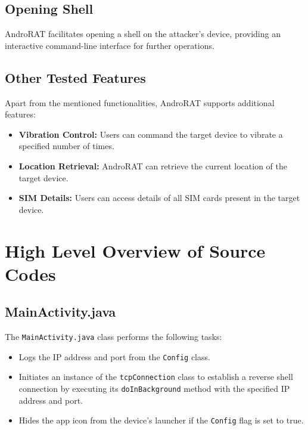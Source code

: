 \documentclass[12pt]{article}
\begin{document}
\subsection{Opening Shell}
AndroRAT facilitates opening a shell on the attacker's device, providing an interactive command-line interface for further operations.

\subsection{Other Tested Features}
Apart from the mentioned functionalities, AndroRAT supports additional features:
\begin{itemize}
    \item \textbf{Vibration Control:} Users can command the target device to vibrate a specified number of times.
    \item \textbf{Location Retrieval:} AndroRAT can retrieve the current location of the target device.
    \item \textbf{SIM Details:} Users can access details of all SIM cards present in the target device.
\end{itemize}

\section{High Level Overview of Source Codes}

\subsection{MainActivity.java}
The \texttt{MainActivity.java} class performs the following tasks:
\begin{itemize}
    \item Logs the IP address and port from the \texttt{Config} class.
    \item Initiates an instance of the \texttt{tcpConnection} class to establish a reverse shell connection by executing its \texttt{doInBackground} method with the specified IP address and port.
    \item Hides the app icon from the device's launcher if the \texttt{Config} flag is set to true.
\end{itemize}
\end{document}
